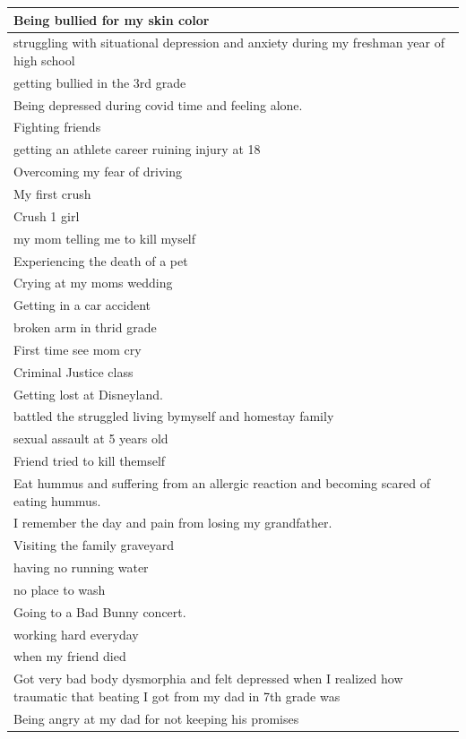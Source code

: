 \documentclass[
  .7em,
  letterpaper,
  DIV=11,
  numbers=noendperiod]{scrartcl}
\begin{document}
\begin{table}
\begin{tabular}{l}
\hline
Being bullied for my skin color\\
\hline
struggling with situational depression and anxiety during my freshman year of high school\\
\hline
getting bullied in the 3rd grade\\
\hline
Being depressed during covid time and feeling alone.\\
\hline
Fighting friends\\
\hline
getting an athlete career ruining injury at 18\\
\hline
Overcoming my fear of driving\\
\hline
My first crush\\
\hline
Crush 1 girl\\
\hline
my mom telling me to kill myself\\
\hline
Experiencing the death of a pet\\
\hline
Crying at my moms wedding\\
\hline
Getting in a car accident\\
\hline
broken arm in thrid grade\\
\hline
First time see mom cry\\
\hline
Criminal Justice class\\
\hline
Getting lost at Disneyland.\\
\hline
battled the struggled living bymyself and homestay family\\
\hline
sexual assault at 5 years old\\
\hline
Friend tried to kill themself\\
\hline
Eat hummus and suffering from an allergic reaction and becoming scared of eating hummus.\\
\hline
I remember the day and pain from losing my grandfather.\\
\hline
Visiting the family graveyard\\
\hline
having no running water\\
\hline
no place to wash\\
\hline
Going to a Bad Bunny concert.\\
\hline
working hard everyday\\
\hline
when my friend died\\
\hline
Got very bad body dysmorphia and felt depressed when I realized how traumatic that beating I got from my dad in 7th grade was\\
\hline
Being angry at my dad for not keeping his promises\\

\end{tabular}
\end{table}
\end{document}
